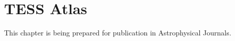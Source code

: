 \chapter[TESS Atlas]{TESS Atlas}
\label{ch.tess}

This chapter is being prepared for publication in Astrophysical Journals.


